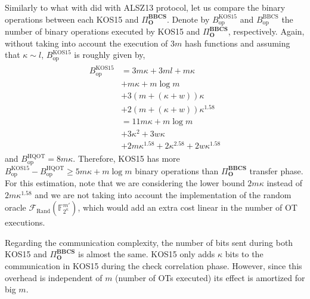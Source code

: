 Similarly to what with did with ALSZ13 protocol, let us compare the binary operations between each KOS15 and $\Pi^{\textbf{BBCS}}_{\textbf{O}}$. Denote by $B_{\text{op}}^\text{KOS15}$ and $B_{\text{op}}^\text{BBCS}$ the number of binary operations executed by KOS15 and $\Pi^{\textbf{BBCS}}_{\textbf{O}}$, respectively. Again, without taking into account the execution of $3 m$ hash functions and assuming that $\kappa \sim l$, $B_{\text{op}}^\text{KOS15}$ is roughly given by,
\begin{eqnarray*}
\begin{split}
    B_{\text{op}}^\text{KOS15} &= 3m\kappa + 3ml + m\kappa \\
    &+ m\kappa + m \log m \\
    &+ 3(m + (\kappa + w))\kappa \\
    &+ 2(m + (\kappa + w))\kappa^{1.58}\\
    &= 11 m \kappa  + m\log m \\
    &+ 3\kappa^2 + 3w\kappa  \\
    &+ 2 m \kappa^{1.58} + 2 \kappa^{2.58} + 2w\kappa^{1.58}
\end{split}
\end{eqnarray*}
and $B_{\text{op}}^\text{HQOT} = 8 m \kappa$. Therefore, KOS15 has more $B_{\text{op}}^\text{KOS15} - B_{\text{op}}^\text{HQOT}  \geq 5 m\kappa + m\log m$ binary operations than $\Pi^{\textbf{BBCS}}_{\textbf{O}}$ transfer phase. 
For this estimation, note that we are considering the lower bound $2 m \kappa$ instead of $2 m \kappa^{1.58}$ and we are not taking into account the implementation of the random oracle $\mathcal{F}_{\text{Rand}}(\mathbb{F}^{m'}_{2^\kappa})$, which would add an extra cost linear in the number of OT executions.

Regarding the communication complexity, the number of bits sent during both KOS15 and $\Pi^{\textbf{BBCS}}_{\textbf{O}}$ is almost the same. KOS15 only adds $\kappa$ bits to the communication in KOS15 during the check correlation phase. However, since this overhead is independent of $m$ (number of OTs executed) its effect is amortized for big $m$.

